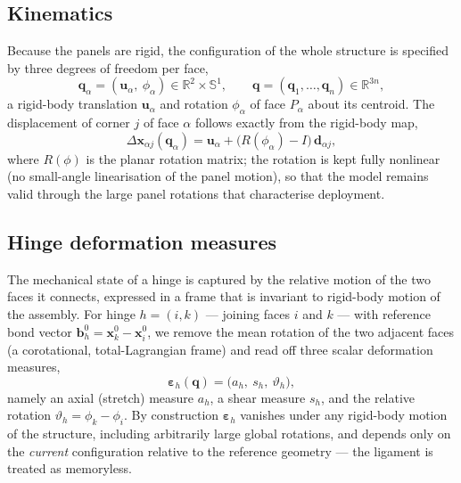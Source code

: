 \documentclass[pdflatex,sn-mathphys-num]{sn-jnl}%
\theoremstyle{thmstyleone}%
\theoremstyle{thmstyletwo}%
\theoremstyle{thmstylethree}%
\begin{document}
\subsection{Kinematics}

Because the panels are rigid, the configuration of the whole structure is
specified by three degrees of freedom per face,
\begin{equation}
  \bm{q}_\alpha = (\bm{u}_\alpha,\ \phi_\alpha) \in \mathbb{R}^2 \times \mathbb{S}^1,
  \qquad
  \bm{q} = (\bm{q}_1,\dots,\bm{q}_{n}) \in \mathbb{R}^{3n},
\end{equation}
a rigid-body translation $\bm{u}_\alpha$ and rotation $\phi_\alpha$ of face
$P_\alpha$ about its centroid. The displacement of corner $j$ of face $\alpha$
follows exactly from the rigid-body map,
\begin{equation}
  \Delta\bm{x}_{\alpha j}(\bm{q}_\alpha)
    = \bm{u}_\alpha + \bigl(R(\phi_\alpha) - I\bigr)\,\bm{d}_{\alpha j},
\end{equation}
where $R(\phi)$ is the planar rotation matrix; the rotation is kept fully
nonlinear (no small-angle linearisation of the panel motion), so that the model
remains valid through the large panel rotations that characterise deployment.

\subsection{Hinge deformation measures}

The mechanical state of a hinge is captured by the relative motion of the two
faces it connects, expressed in a frame that is invariant to rigid-body motion of
the assembly. For hinge $h=(i,k)$ --- joining faces $i$ and $k$ --- with reference
bond vector $\bm{b}_h^{0} = \bm{x}_k^{0} - \bm{x}_i^{0}$, we remove the mean
rotation of the two adjacent faces (a corotational, total-Lagrangian frame) and
read off three scalar deformation measures,
\begin{equation}
  \bm{\varepsilon}_h(\bm{q}) = \bigl(a_h,\ s_h,\ \vartheta_h\bigr),
  \label{eq:hinge-strain}
\end{equation}
namely an axial (stretch) measure $a_h$, a shear measure $s_h$, and the relative
rotation $\vartheta_h = \phi_k - \phi_i$. By construction $\bm{\varepsilon}_h$
vanishes under any rigid-body motion of the structure, including arbitrarily large
global rotations, and depends only on the \emph{current} configuration relative to
the reference geometry --- the ligament is treated as memoryless. 
\end{document}
